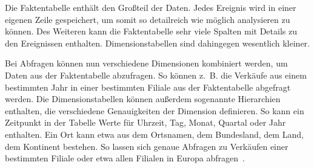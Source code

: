 Die Faktentabelle enthält den Großteil der Daten.
Jedes Ereignis wird in einer eigenen Zeile gespeichert, um somit so detailreich wie möglich analysieren zu können.
Des Weiteren kann die Faktentabelle sehr viele Spalten mit Details zu den Ereignissen enthalten.
Dimensionstabellen sind dahingegen wesentlich kleiner\cite[S.~101-103]{kleppmann_datenintensive_2019}.

Bei Abfragen können nun verschiedene Dimensionen kombiniert werden, um Daten aus der Faktentabelle abzufragen.
So können z.~B. die Verkäufe aus einem bestimmten Jahr in einer bestimmten Filiale aus der Faktentabelle abgefragt werden.
Die Dimensionstabellen können außerdem sogenannte Hierarchien enthalten, die verschiedene Genauigkeiten der Dimension definieren.
So kann ein Zeitpunkt in der Tabelle Werte für Uhrzeit, Tag, Monat, Quartal oder Jahr enthalten.
Ein Ort kann etwa aus dem Ortsnamen, dem Bundesland, dem Land, dem Kontinent bestehen.
So lassen sich genaue Abfragen zu Verkäufen einer bestimmten Filiale oder etwa allen Filialen in Europa abfragen~\cite[S.~5]{vaisman_data_2022}.

